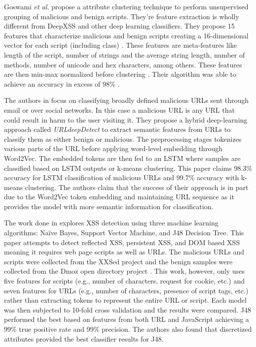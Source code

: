 Goswami \textit{et al.} propose a attribute clustering technique to perform unsupervised grouping of malicious and benign scripts. They're feature extraction is wholly different from DeepXSS and other deep learning classifiers. They propose 15 features that characterize malicious and benign scripts creating a 16-dimensional vector for each script (including class) \cite{goswami2017unsupervised}. These features are meta-features like length of the script, number of strings and the average string length, number of methods, number of unicode and hex characters, among others. These features are then min-max normalized before clustering \cite{goswami2017unsupervised}. Their algorithm was able to achieve an accuracy in excess of 98\% \cite{goswami2017unsupervised}.  

The authors in \cite{afzal2021deeplearning} focus on classifying broadly defined malicious URLs sent through email or over social networks.  In this case a malicious URL is any URL that could result in harm to the user visiting it.  They propose a hybrid deep-learning approach called \textit{URLdeepDetect} to extract semantic features from URLs to classify them as either benign or malicious.  The preprocessing stages tokenizes various parts of the URL before applying word-level embedding through Word2Vec.  The embedded tokens are then fed to an LSTM where samples are classified based on LSTM outputs or k-means clustering.  This paper claims 98.3\% accuracy for LSTM classification of malicious URLs and 99.7\% accuracy with k-means clustering.  The authors claim that the success of their approach is in part due to the Word2Vec token embedding and maintaining URL sequence as it provides the model with more semantic information for classification.

The work done in \cite{vishnu2014prediction} explores XSS detection using three machine learning algorithms: Naïve Bayes, Support Vector Machine, and J48 Decision Tree.  This paper attempts to detect reflected XSS, persistent XSS, and DOM based XSS meaning it requires web page scripts as well as URLs.  The malicious URLs and scripts were collected from the XXSed \cite{xssed} project and the benign samples were collected from the Dmoz open directory project \cite{dmoz}.  This work, however, only uses five features for scripts (e.g., number of characters, request for cookie, etc.) and seven features for URLs (e.g., number of characters, presence of script tags, etc.) rather than extracting tokens to represent the entire URL or script.  Each model was then subjected to 10-fold cross validation and the results were compared.  J48 performed the best based on features from both URL and JavaScript achieving a 99\% true positive rate and 99\% precision.  The authors also found that discretized attributes provided the best classifier results for J48.


